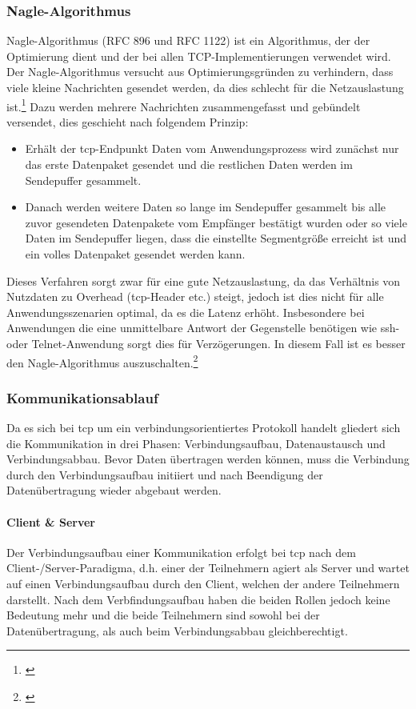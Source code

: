 \subsubsection{Nagle-Algorithmus}
Nagle-Algorithmus (RFC 896 und RFC 1122) ist ein Algorithmus, der der Optimierung dient und der bei allen TCP-Implementierungen verwendet wird. Der Nagle-Algorithmus versucht aus Optimierungsgründen zu verhindern, dass viele kleine Nachrichten gesendet werden, da dies schlecht für die Netzauslastung ist.\footnote{\citep[vgl.][Grundkurs Datenkommunikation, Seite 198]{Mandl.GrundkursDatenkommunikation}\label{note45}} \newline
Dazu werden mehrere Nachrichten zusammengefasst und gebündelt versendet, dies geschieht nach folgendem Prinzip:
\begin{itemize}
	\item{Erhält der \gls{tcp}-Endpunkt Daten vom Anwendungsprozess wird zunächst nur das erste Datenpaket gesendet und die restlichen Daten werden im Sendepuffer gesammelt.}
	\item{Danach werden weitere Daten so lange im Sendepuffer gesammelt bis alle zuvor gesendeten Datenpakete vom Empfänger bestätigt wurden oder so viele Daten im Sendepuffer liegen, dass die einstellte Segmentgröße erreicht ist und ein volles Datenpaket gesendet werden kann.}
\end{itemize}
Dieses Verfahren sorgt zwar für eine gute Netzauslastung, da das Verhältnis von Nutzdaten zu Overhead (\gls{tcp}-Header etc.) steigt, jedoch ist dies nicht für alle Anwendungsszenarien optimal, da es die Latenz erhöht. Insbesondere bei Anwendungen die eine unmittelbare Antwort der Gegenstelle benötigen wie \gls{ssh}- oder Telnet-Anwendung sorgt dies für Verzögerungen. In diesem Fall ist es besser den Nagle-Algorithmus auszuschalten.\footnote{\citep[vgl.][Grundkurs Datenkommunikation, Seite 198 f.]{Mandl.GrundkursDatenkommunikation}\label{note65}}
\subsubsection{Kommunikationsablauf}
Da es sich bei \gls{tcp} um ein verbindungsorientiertes Protokoll handelt gliedert sich die Kommunikation in drei Phasen: Verbindungsaufbau, Datenaustausch und Verbindungsabbau. Bevor Daten übertragen werden können, muss die Verbindung durch den Verbindungsaufbau initiiert und nach Beendigung der Datenübertragung wieder abgebaut werden. 
\paragraph{Client \& Server}
Der Verbindungsaufbau einer Kommunikation erfolgt bei \gls{tcp} nach dem Client-/Server-Paradigma, d.h. einer der Teilnehmern agiert als Server und wartet auf einen Verbindungsaufbau durch den Client, welchen der andere Teilnehmern darstellt. \newline
Nach dem Verbfindungsaufbau haben die beiden Rollen jedoch keine Bedeutung mehr und die beide Teilnehmern sind sowohl bei der Datenübertragung, als auch beim Verbindungsabbau gleichberechtigt.
